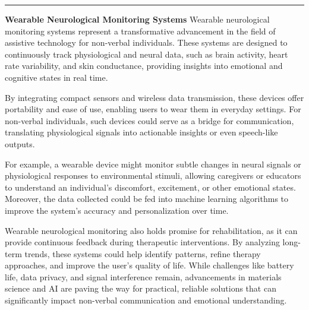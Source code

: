\documentclass[12pt, research paper]{report}
\begin{document}
	\noindent \rule{13.85cm}{0.01cm}
	\textbf{Wearable Neurological Monitoring Systems}
	\newline Wearable neurological monitoring systems represent a transformative advancement in the field of assistive technology for non-verbal individuals. These systems are designed to continuously track physiological and neural data, such as brain activity, heart rate variability, and skin conductance, providing insights into emotional and cognitive states in real time.
	\bigskip 
	
	\noindent By integrating compact sensors and wireless data transmission, these devices offer portability and ease of use, enabling users to wear them in everyday settings. For non-verbal individuals, such devices could serve as a bridge for communication, translating physiological signals into actionable insights or even speech-like outputs.
	\bigskip 
	
	\noindent For example, a wearable device might monitor subtle changes in neural signals or physiological responses to environmental stimuli, allowing caregivers or educators to understand an individual's discomfort, excitement, or other emotional states. Moreover, the data collected could be fed into machine learning algorithms to improve the system's accuracy and personalization over time.
	\bigskip 
	
	\noindent Wearable neurological monitoring also holds promise for rehabilitation, as it can provide continuous feedback during therapeutic interventions. By analyzing long-term trends, these systems could help identify patterns, refine therapy approaches, and improve the user’s quality of life. While challenges like battery life, data privacy, and signal interference remain, advancements in materials science and AI are paving the way for practical, reliable solutions that can significantly impact non-verbal communication and emotional understanding.
	
\end{document}
